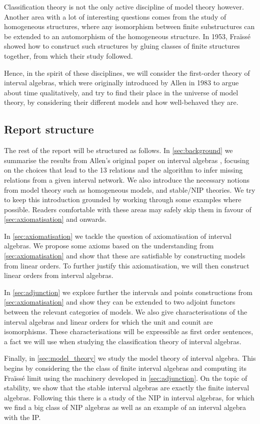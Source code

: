 Classification theory is not the only active discipline of model theory however. Another
area with a lot of interesting questions comes from the study of homogeneous structures,
where any isomorphism between finite substructures can be extended to an automorphism of
the homogeneous structure. In 1953, Fraïssé showed how to construct such structures
by gluing classes of finite structures together, from which their study followed.

Hence, in the spirit of these disciplines, we will consider the first-order theory of
interval algebras, which were originally introduced by Allen in 1983 to argue about time
qualitatively, and try to find their place in the universe of model
theory, by considering their different models and how well-behaved they are.

\subsection{Report structure}%
\label{sub:report_structure}

The rest of the report will be structured as follows. In
\cref{sec:background} we summarise the results from Allen's original paper
on interval algebras \cite{allen83}, focusing on the choices that lead to
the 13 relations and the algorithm to infer missing relations from a given
interval network. We also introduce the necessary notions from model theory
such as homogeneous models, and stable/NIP theories. We try to keep this
introduction grounded by working through some examples where possible.
Readers comfortable with these areas may safely skip them in favour of
\cref{sec:axiomatisation} and onwards.

In \cref{sec:axiomatisation} we tackle the question of axiomatisation of
interval algebras. We propose some axioms based on the understanding from
\cref{sec:axiomatisation} and show that these are satisfiable by
constructing models from linear orders. To further justify this
axiomatisation, we will then construct linear orders from interval
algebras.

In \cref{sec:adjunction} we explore further the intervals and points
constructions from \cref{sec:axiomatisation} and show they can be extended to two adjoint
functors between the relevant categories of models. We also give characterisations of
the interval algebras and linear orders for which the unit and counit are isomorphisms.
These characterisations will be expressible as first order sentences, a fact we will use
when studying the classification theory of interval algebras.

Finally, in \cref{sec:model_theory} we study the model theory of interval algebra. This
begins by considering the the class of finite interval algebras and computing its
Fraïssé limit using the machinery developed in \cref{sec:adjunction}. On the topic of
stability, we show that the stable interval algebras are exactly the finite interval
algebras. Following this there is a study of the NIP in interval algebras, for which
we find a big class of NIP algebras as well as an example of an interval algebra with the
IP.

